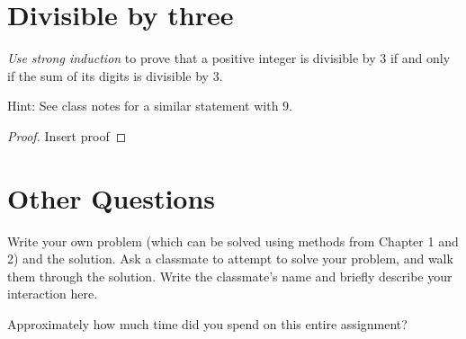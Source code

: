 \documentclass[11pt]{amsart}
\begin{document}
\section{Divisible by three}
\emph{Use strong induction} to prove that a positive integer is divisible by $3$ if and only if the sum of its digits is divisible by $3$.

Hint: See class notes for a similar statement with $9$.

\begin{proof}
	Insert proof
\end{proof}

\section{Other Questions}
Write your own problem (which can be solved using methods from Chapter 1 and 2) and the solution. 
Ask a classmate to attempt to solve your problem, and walk them through the solution. Write the classmate's name and briefly describe your interaction here. 


Approximately how much time did you spend on this entire assignment?
\end{document}

